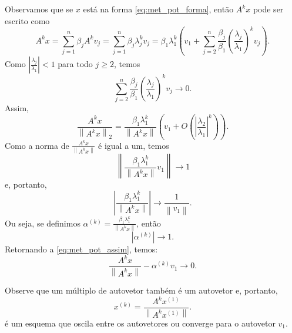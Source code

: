 Observamos que se $x$ está na forma \eqref{eq:met_pot_forma}, então $A^k x$ pode ser escrito como
\begin{equation*}
  A^{k} x = \sum_{j=1}^n \beta_j A^k v_{j} = \sum_{j=1}^n \beta_j \lambda_j^k v_{j} = \beta_1\lambda_1^k\left(v_1+\sum_{j=2}^n\frac{\beta_j}{\beta_1} \left(\frac{\lambda_j}{\lambda_1}\right)^k v_{j}\right).
\end{equation*}
Como $\left|\frac{\lambda_j}{\lambda_1}\right|<1$ para todo $j\geq 2$, temos
\begin{equation*}
  \sum_{j=2}^n\frac{\beta_j}{\beta_1} \left(\frac{\lambda_j}{\lambda_1}\right)^k v_{j} \to 0.
\end{equation*}
Assim,
\begin{equation}\label{eq:met_pot_assim}
  \frac{A^k x}{\left\|A^k x\right\|_2} = \frac{\beta_1\lambda_1^k}{\left\|A^k x\right\|}\left( v_1 + O\left(\left|\frac{\lambda_2}{\lambda_1}\right|^k\right)\right).
\end{equation}
Como a norma de $\frac{A^k x}{\left\|A^k x\right\|}$ é igual a um, temos
\begin{equation*}
  \left\|\frac{\beta_1\lambda_1^k}{\left\|A^k x\right\|}v_1\right\| \to 1
\end{equation*}
e, portanto,
\begin{equation*}
  \left|\frac{\beta_1\lambda_1^k}{\left\|A^k x\right\|}\right| \to \frac{1}{\left\|v_1\right\|}.
\end{equation*}
Ou seja, se definimos $\alpha^{(k)}=\frac{\beta_1\lambda_1^k}{\left\|A^k x\right\|}$, então
\begin{equation*}
  |\alpha^{(k)}|\to 1.
\end{equation*}
Retornando a \eqref{eq:met_pot_assim}, temos:
\begin{equation*}
  \frac{A^k x}{\left\|A^k x\right\|}-\alpha^{(k)} v_1 \to 0.
\end{equation*}

Observe que um múltiplo de autovetor também é um autovetor e, portanto,
\begin{equation*}
  x^{(k)}=\frac{A^k x^{(1)}}{\left\|A^k x^{(1)}\right\|}.
\end{equation*}
é um esquema que oscila entre os autovetores ou converge para o autovetor $v_1$.

